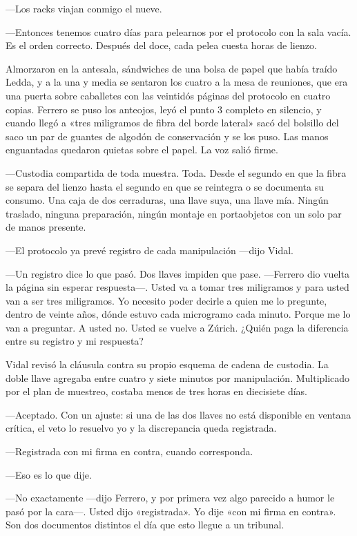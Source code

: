 ---Los racks viajan conmigo el nueve.

---Entonces tenemos cuatro días para pelearnos por el protocolo con la sala vacía. Es el orden correcto. Después del doce, cada pelea cuesta horas de lienzo.

Almorzaron en la antesala, sándwiches de una bolsa de papel que había traído Ledda, y a la una y media se sentaron los cuatro a la mesa de reuniones, que era una puerta sobre caballetes con las veintidós páginas del protocolo en cuatro copias. Ferrero se puso los anteojos, leyó el punto 3 completo en silencio, y cuando llegó a «tres miligramos de fibra del borde lateral» sacó del bolsillo del saco un par de guantes de algodón de conservación y se los puso. Las manos enguantadas quedaron quietas sobre el papel. La voz salió firme.

---Custodia compartida de toda muestra. Toda. Desde el segundo en que la fibra se separa del lienzo hasta el segundo en que se reintegra o se documenta su consumo. Una caja de dos cerraduras, una llave suya, una llave mía. Ningún traslado, ninguna preparación, ningún montaje en portaobjetos con un solo par de manos presente.

---El protocolo ya prevé registro de cada manipulación ---dijo Vidal.

---Un registro dice lo que pasó. Dos llaves impiden que pase. ---Ferrero dio vuelta la página sin esperar respuesta---. Usted va a tomar tres miligramos y para usted van a ser tres miligramos. Yo necesito poder decirle a quien me lo pregunte, dentro de veinte años, dónde estuvo cada microgramo cada minuto. Porque me lo van a preguntar. A usted no. Usted se vuelve a Zúrich. ¿Quién paga la diferencia entre su registro y mi respuesta?

Vidal revisó la cláusula contra su propio esquema de cadena de custodia. La doble llave agregaba entre cuatro y siete minutos por manipulación. Multiplicado por el plan de muestreo, costaba menos de tres horas en diecisiete días.

---Aceptado. Con un ajuste: si una de las dos llaves no está disponible en ventana crítica, el veto lo resuelvo yo y la discrepancia queda registrada.

---Registrada con mi firma en contra, cuando corresponda.

---Eso es lo que dije.

---No exactamente ---dijo Ferrero, y por primera vez algo parecido a humor le pasó por la cara---. Usted dijo «registrada». Yo dije «con mi firma en contra». Son dos documentos distintos el día que esto llegue a un tribunal.

